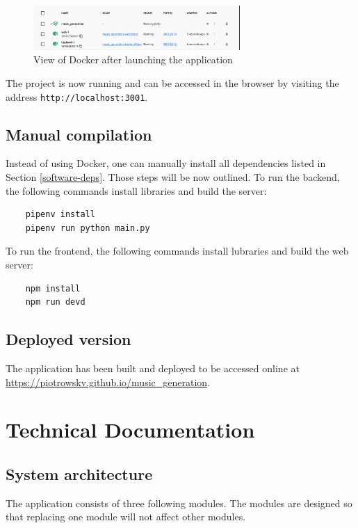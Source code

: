 \documentclass{article}
\begin{document}
\begin{figure}[H]
    \centering
    \includegraphics[width=0.7\textwidth]{assets/docker_sample.png}
    \caption{View of Docker after launching the application}
    \label{fig:docker}
\end{figure}

The project is now running and can be accessed in the browser by visiting the address \verb|http://localhost:3001|.


\subsection{Manual compilation}

Instead of using Docker, one can manually install all dependencies listed in Section \ref{software-deps}. Those steps will be now outlined. To run the backend, the following commands install libraries and build the server:

\begin{lstlisting}
    pipenv install
    pipenv run python main.py
\end{lstlisting}

To run the frontend, the following commands install lubraries and build the web server:

\begin{lstlisting}
    npm install
    npm run devd
\end{lstlisting}

\subsection{Deployed version}

The application has been built and deployed to be accessed online at \url{https://piotrowskv.github.io/music_generation}.

\section{Technical Documentation}
\subsection{System architecture}
The application consists of three following modules. The modules are designed so that replacing one module will not affect other modules.
\end{document}
